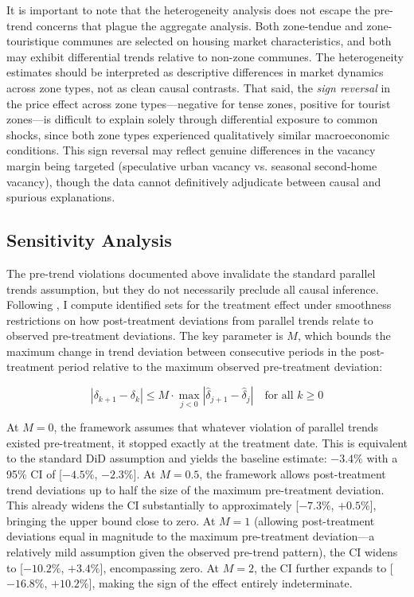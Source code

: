 \documentclass[12pt]{article}
\begin{document}
It is important to note that the heterogeneity analysis does not escape the pre-trend concerns that plague the aggregate analysis. Both zone-tendue and zone-touristique communes are selected on housing market characteristics, and both may exhibit differential trends relative to non-zone communes. The heterogeneity estimates should be interpreted as descriptive differences in market dynamics across zone types, not as clean causal contrasts. That said, the \textit{sign reversal} in the price effect across zone types---negative for tense zones, positive for tourist zones---is difficult to explain solely through differential exposure to common shocks, since both zone types experienced qualitatively similar macroeconomic conditions. This sign reversal may reflect genuine differences in the vacancy margin being targeted (speculative urban vacancy vs. seasonal second-home vacancy), though the data cannot definitively adjudicate between causal and spurious explanations.


\subsection{Sensitivity Analysis}

The pre-trend violations documented above invalidate the standard parallel trends assumption, but they do not necessarily preclude all causal inference. Following \citet{rambachan2023more}, I compute identified sets for the treatment effect under smoothness restrictions on how post-treatment deviations from parallel trends relate to observed pre-treatment deviations. The key parameter is $M$, which bounds the maximum change in trend deviation between consecutive periods in the post-treatment period relative to the maximum observed pre-treatment deviation:

\begin{equation}
|\delta_{k+1} - \delta_k| \leq M \cdot \max_{j < 0} |\hat{\delta}_{j+1} - \hat{\delta}_j| \quad \text{for all } k \geq 0
\end{equation}

At $M = 0$, the framework assumes that whatever violation of parallel trends existed pre-treatment, it stopped exactly at the treatment date. This is equivalent to the standard DiD assumption and yields the baseline estimate: $-3.4\%$ with a 95\% CI of [$-4.5\%$, $-2.3\%$]. At $M = 0.5$, the framework allows post-treatment trend deviations up to half the size of the maximum pre-treatment deviation. This already widens the CI substantially to approximately [$-7.3\%$, $+0.5\%$], bringing the upper bound close to zero. At $M = 1$ (allowing post-treatment deviations equal in magnitude to the maximum pre-treatment deviation---a relatively mild assumption given the observed pre-trend pattern), the CI widens to [$-10.2\%$, $+3.4\%$], encompassing zero. At $M = 2$, the CI further expands to [$-16.8\%$, $+10.2\%$], making the sign of the effect entirely indeterminate.
\end{document}
